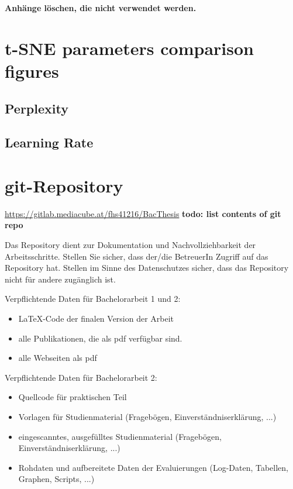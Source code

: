 \begin{appendices}
\textbf{\color{red} Anhänge löschen, die nicht verwendet werden.}

\section{t-SNE parameters comparison figures}
\label{appendix:tSNEParameters}
\subsection{Perplexity}

\label{appendix:tSNEParametersPerplexity}

\subsection{Learning Rate}

\label{appendix:tSNEParametersLearningRate}





\section{git-Repository}

\url{https://gitlab.mediacube.at/fhs41216/BacThesis}
\textbf{todo: list contents of git repo}

Das Repository dient zur Dokumentation und Nachvollziehbarkeit der Arbeitsschritte. Stellen Sie sicher, dass der/die BetreuerIn Zugriff auf das Repository hat. Stellen im Sinne des Datenschutzes sicher, dass das Repository nicht für andere zugänglich ist.

Verpflichtende Daten für Bachelorarbeit 1 und 2:

\begin{itemize}
	\item LaTeX-Code der finalen Version der Arbeit
	\item alle Publikationen, die als pdf verfügbar sind.
	\item alle Webseiten als pdf
\end{itemize}

Verpflichtende Daten für Bachelorarbeit 2:
\begin{itemize}
	\item Quellcode für praktischen Teil
	\item Vorlagen für Studienmaterial (Fragebögen, Einverständniserklärung, ...)	
	\item eingescanntes, ausgefülltes Studienmaterial (Fragebögen, Einverständniserklärung, ...)
	\item Rohdaten und aufbereitete Daten der Evaluierungen (Log-Daten, Tabellen, Graphen, Scripts, ...)	
\end{itemize}


\end{appendices}
